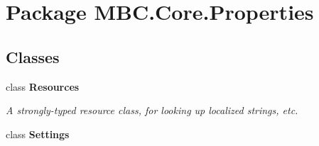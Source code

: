 \hypertarget{namespace_m_b_c_1_1_core_1_1_properties}{\section{Package M\-B\-C.\-Core.\-Properties}
\label{namespace_m_b_c_1_1_core_1_1_properties}
}
\subsection*{Classes}
\begin{DoxyCompactItemize}
\item 
class {\bfseries Resources}
\begin{DoxyCompactList}\small\item\em A strongly-\/typed resource class, for looking up localized strings, etc. \end{DoxyCompactList}\item 
class {\bfseries Settings}
\end{DoxyCompactItemize}
